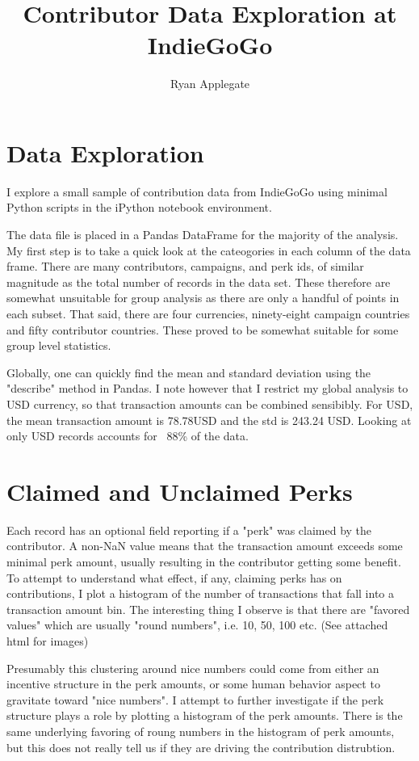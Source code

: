 \documentclass{article}[12pt]
\title{Contributor Data Exploration at IndieGoGo}
\author{Ryan Applegate}
\begin{document}
\maketitle

\section{Data Exploration}

I explore a small sample of contribution data from IndieGoGo using minimal Python
scripts in the iPython notebook environment.

The data file is placed in a Pandas DataFrame for the majority of the analysis. My
first step is to take a quick look at the cateogories in each column of the data frame.
There are many contributors, campaigns, and perk ids, of similar magnitude as the total
number of records in the data set. These therefore are somewhat unsuitable for group
analysis as there are only a handful of points in each subset. That said, there are four
currencies, ninety-eight campaign countries and fifty contributor countries. These proved
to be somewhat suitable for some group level  statistics.


Globally, one can quickly find the mean and standard deviation using the "describe" method
in Pandas. I note however that I restrict my global analysis to USD currency, so that
transaction amounts can be combined sensibibly. For USD, the mean transaction amount is 78.78USD
and the std is 243.24 USD. Looking at only USD records accounts for ~88\% of the data.

\section{Claimed and Unclaimed Perks}

Each record has an optional field reporting if a "perk" was claimed by the contributor.
A non-NaN value means that the transaction amount exceeds some minimal perk amount, usually
resulting in the contributor getting some benefit. To attempt to understand what effect, if
any, claiming perks has on contributions, I plot a histogram of the number of transactions that
fall into a transaction amount bin. The interesting thing I observe is that there are "favored
values" which are usually "round numbers", i.e. 10, 50, 100 etc. (See attached html for images)

Presumably this clustering around nice numbers could come from either an incentive structure
in the perk amounts, or some human behavior aspect to gravitate toward "nice numbers". I attempt
to further investigate if the perk structure plays a role by plotting a histogram of the perk
amounts. There is the same underlying favoring of roung numbers in the histogram of perk
amounts, but this does not really tell us if they are driving the contribution distrubtion.
\end{document}
